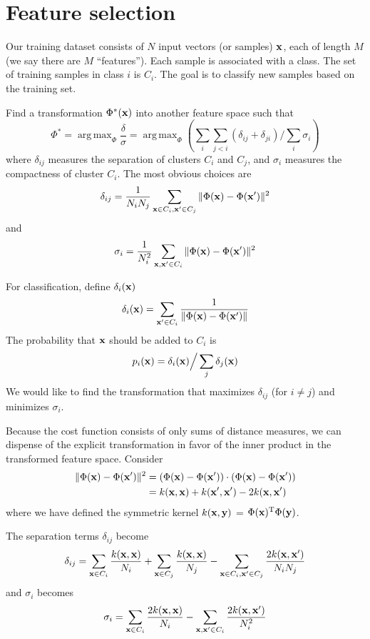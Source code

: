\documentclass{article}
\newcommand{\bx}{{\bf x}}
\newcommand{\by}{{\bf y}}
\newcommand{\bxp}{\bx^{\prime}}
\DeclareMathOperator*{\argmax}{arg\,max}
\begin{document}
\section*{Feature selection}

Our training dataset consists of $N$ input vectors (or samples) $\bx$,
each of length $M$ (we say there are $M$ ``features''). Each sample is
associated with a class. The set of training samples in class $i$ is $C_i$.
The goal is to classify new samples based on the training set.

Find a transformation $\Phi^*(\bx)$ into another feature space
such that
\[
\Phi^* = \argmax_{\Phi} \frac{\delta}{\sigma} = \argmax_{\Phi} ( \sum_i \sum_{j < i}
(\delta_{ij} + \delta_{ji}) \Big / \sum_i \sigma_i )
\]
where $\delta_{ij}$ measures the separation of clusters
$C_i$ and $C_j$, and $\sigma_i$ measures the compactness of cluster $C_i$.
The most obvious choices are
\[
\delta_{ij} =
  \frac{1}{N_i N_j}
  \sum_{\bx \in C_i, \bxp \in C_j} \| \Phi(\bx) - \Phi(\bxp) \|^2
\]
and
\[
\sigma_i =
  \frac{1}{N_i^2} \sum_{\bx, \bxp \in C_i} \| \Phi(\bx) - \Phi(\bxp) \|^2
\]

For classification, define $\delta_i(\bx)$
\[
\delta_i(\bx) = \sum_{\bxp \in C_i} \frac{1}{\| \Phi(\bx) - \Phi(\bxp)
\|}
\]
The probability that $\bx$ should be added to $C_i$ is
\[
p_i(\bx) = \delta_i(\bx) \Big / \sum_j \delta_j(\bx)
\]
We would like to find the transformation that maximizes $\delta_{ij}$
(for $i \neq j$) and minimizes $\sigma_i$.


Because the cost function consists of only sums of distance measures,
we can dispense of the explicit transformation in favor of the inner
product in the transformed feature space. Consider
\begin{align*}
\| \Phi(\bx) - \Phi(\bxp) \|^2 &= 
(\Phi(\bx) - \Phi(\bxp)) \cdot (\Phi(\bx) - \Phi(\bxp)) \\
&= k(\bx, \bx) + k(\bxp, \bxp) - 2 k(\bx, \bxp)
\end{align*}
where we have defined the symmetric kernel $k(\bx, \by)$ = $\Phi(\bx)^{\rm
T}\Phi(\by)$.

The separation terms $\delta_{ij}$ become
\[
\delta_{ij} = 
  \sum_{\bx \in C_i} \frac{k(\bx, \bx)}{N_i} +
  \sum_{\bx \in C_j} \frac{k(\bx, \bx)}{N_j} -
  \sum_{\bx \in C_i, \bxp \in C_j} \frac{2 k(\bx, \bxp)}{N_i N_j}
\]
and $\sigma_i$ becomes
\[
\sigma_i =
   \sum_{\bx \in C_i} \frac{2 k(\bx, \bx)}{N_i} -
   \sum_{\bx, \bxp \in C_i} \frac{2 k(\bx, \bxp)}{N_i^2}
\]
\end{document}
